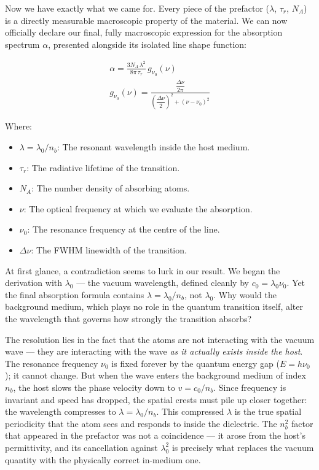 Now we have exactly what we came for. Every piece of the prefactor ($\lambda$, $\tau_r$, $N_A$) is a directly measurable macroscopic property of the material. We can now officially declare our final, fully macroscopic expression for the absorption spectrum $\alpha$, presented alongside its isolated line shape function:
\begin{keyresult}
    \begin{gather}
        \alpha = \frac{3N_A\,\lambda^2}{8\pi\,\tau_r}\,g_{\nu_0}(\nu) \\[2ex]
        g_{\nu_0}(\nu) = \frac{\dfrac{\Delta\nu}{2\pi}}{\left(\dfrac{\Delta\nu}{2}\right)^2 + (\nu - \nu_0)^2}
    \end{gather}
\end{keyresult}
Where:
\begin{itemize}
    \item $\lambda = \lambda_0/n_b$: The resonant wavelength inside the host medium.
    \item $\tau_r$: The radiative lifetime of the transition.
    \item $N_A$: The number density of absorbing atoms.
    \item $\nu$: The optical frequency at which we evaluate the absorption.
    \item $\nu_0$: The resonance frequency at the centre of the line.
    \item $\Delta\nu$: The FWHM linewidth of the transition.
\end{itemize}

\begin{keyinsight}
    At first glance, a contradiction seems to lurk in our result. We began the derivation with $\lambda_0$ — the vacuum wavelength, defined cleanly by $c_0 = \lambda_0\nu_0$. Yet the final absorption formula contains $\lambda = \lambda_0/n_b$, not $\lambda_0$. Why would the background medium, which plays no role in the quantum transition itself, alter the wavelength that governs how strongly the transition absorbs?

    The resolution lies in the fact that the atoms are not interacting with the vacuum wave — they are interacting with the wave \textit{as it actually exists inside the host}. The resonance frequency $\nu_0$ is fixed forever by the quantum energy gap ($E = h\nu_0$); it cannot change. But when the wave enters the background medium of index $n_b$, the host slows the phase velocity down to $v = c_0/n_b$. Since frequency is invariant and speed has dropped, the spatial crests must pile up closer together: the wavelength compresses to $\lambda = \lambda_0/n_b$. This compressed $\lambda$ is the true spatial periodicity that the atom sees and responds to inside the dielectric. The $n_b^2$ factor that appeared in the prefactor was not a coincidence — it arose from the host's permittivity, and its cancellation against $\lambda_0^2$ is precisely what replaces the vacuum quantity with the physically correct in-medium one.
\end{keyinsight}

